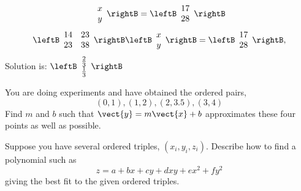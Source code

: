 \begin{enumialphparenastyle}
\begin{ex}
\begin{sol}
\[\begin{array}{c}
x \\
y
\end{array}
\rightB =\leftB
\begin{array}{c}
17 \\
28
\end{array}
\rightB
\]
\[
\leftB
\begin{array}{cc}
14 & 23 \\
23 & 38
\end{array}
\rightB \leftB
\begin{array}{c}
x \\
y
\end{array}
\rightB =\leftB
\begin{array}{c}
17 \\
28
\end{array}
\rightB ,
\]
Solution is: $\leftB
\begin{array}{c}
\frac{2}{3} \\
\frac{1}{3}
\end{array}
\rightB$
\end{sol}
\end{ex}

\begin{ex}
 You are doing experiments and have obtained the ordered pairs, 
\begin{equation*}
\left( 0,1\right) ,\left( 1,2\right) ,\left( 2,3.5\right) ,\left( 3,4\right)
\end{equation*}
Find $m$ and $b$ such that $\vect{y}=m\vect{x}+b$ approximates these four points as well
as possible. 
\end{ex}

\begin{ex}
Suppose you have several ordered triples, $\left(
x_{i},y_{i},z_{i}\right) .$ Describe how to find a polynomial such as  
\begin{equation*}
z=a+bx+cy+dxy+ex^{2}+fy^{2}
\end{equation*}
 giving the best fit to the given ordered triples.
\end{ex}

\end{enumialphparenastyle}